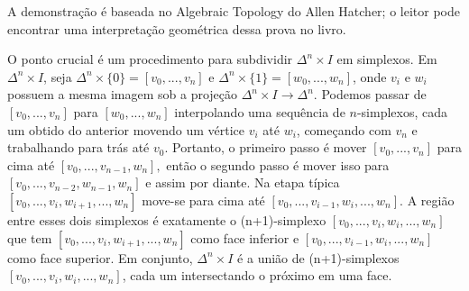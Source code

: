 \begin{dem}
    A demonstração é baseada no Algebraic Topology do Allen Hatcher; o leitor pode encontrar uma interpretação geométrica dessa prova no livro.

    O ponto crucial é um procedimento para subdividir $\Delta^n\times I$ em simplexos. Em $\Delta^n\times I$, seja $\Delta^n\times \{0\}=[v_0,...,v_n]$ e $\Delta^n\times\{1\}=[w_0,...,w_n]$, onde $v_i$ e $w_i$ possuem a mesma imagem sob a projeção $\Delta^n\times I\rightarrow \Delta^n$. Podemos passar de $[v_0,...,v_n]$ para $[w_0,...,w_n]$ interpolando uma sequência de $n$-simplexos, cada um obtido do anterior movendo um vértice $v_i$ até $w_i$, começando com $v_n$ e trabalhando para trás até $v_0$. Portanto, o primeiro passo é mover $[v_0,...,v_n]$ para cima até $[v_0,...,v_{n-1},w_n],$ então o segundo passo é mover isso para $[v_0,...,v_{n-2}, w_{n-1},w_n]$ e assim por diante. Na etapa típica $[v_0,...,v_{i},w_{i+1},...,w_n]$ move-se para cima até $[v_0,...,v_{i-1},w_i,...,w_n]$. A região entre esses dois simplexos é exatamente o (n+1)-simplexo $[v_0,...,v_i,w_i,...,w_n]$ que tem $[v_0,...,v_i,w_{i+1},...,w_n]$ como face inferior e $[v_0,...,v_{i-1},w_i,...,w_n]$ como face superior. Em conjunto, $\Delta^n\times I$ é a união de (n+1)-simplexos $[v_0,...,v_i,w_i,...,w_n]$, cada um intersectando o próximo em uma face.


\end{dem}
